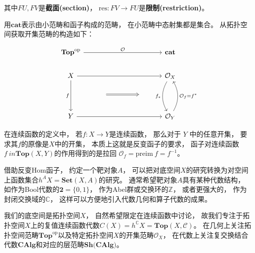 \documentclass[10pt, openany]{book}
\begin{document}
其中$FU,FV$是\textbf{截面(section)}，
$\text{res}: FV \to FU$是\textbf{限制(restriction)}。

用$\textbf{cat}$表示由小范畴和函子构成的范畴，
在小范畴中态射集都是集合。
从拓扑空间获取开集范畴的构造如下：

$$
\begin{tikzcd}
\textbf{Top}^\text{op} \arrow[rrrr, "\mathcal O"] &                           &  &    & \textbf{cat}                                               \\
X \arrow[dd, "f"'] \arrow[rrrr]                   &                           &  &    & \mathcal O_X \arrow[dd, "f_*"', bend right]                \\
                                                  & {} \arrow[rr, Rightarrow] &  & {} &                                                            \\
Y \arrow[rrrr]                                    &                           &  &    & \mathcal O_Y \arrow[uu, "\mathcal O_f = f^*"', bend right]
\end{tikzcd}
$$

在连续函数的定义中，
若$f:X \to Y$是连续函数，
那么对于 $Y$ 中的任意开集，
要求其$f$的原像是$X$中的开集，
本质上这就是反变函子的要求，
函子对连续函数$f \ in \textbf{Top}(X,Y)$的作用得到的是拉回
$\mathcal O_f = \text{preim} \ f = f^{-1}$。

借助反变Hom函子，
约定一个靶对象$A$，
可以把对底空间$X$的研究转换为对空间上函数集合$h^A X = \textbf{Set}(X,A)$的研究。
通常希望靶对象$A$具有某种代数结构，
如作为Bool代数的$\textbf{2} = \{0,1\}$，
作为Abel群或交换环的$\mathbb Z$，
或者更强大的，
作为封闭交换域的$\mathbb C$，
这样可以方便地引入代数几何和算子代数的成果。

我们的底空间是拓扑空间$X$，
自然希望限定在连续函数中讨论，
故我们专注于拓扑空间$X$上的复值连续函数代数$C(X) = h^\mathbb C X = \textbf{Top}(X,\mathcal C)$。
在几何上关注拓扑空间范畴$\textbf{Top}^\text{op}$以及特定拓扑空间$X$的开集范畴$\mathcal O_X$，
在代数上关注复交换结合代数$\textbf{CAlg}$和对应的层范畴$\textbf{Sh(CAlg)}$。
\end{document}
